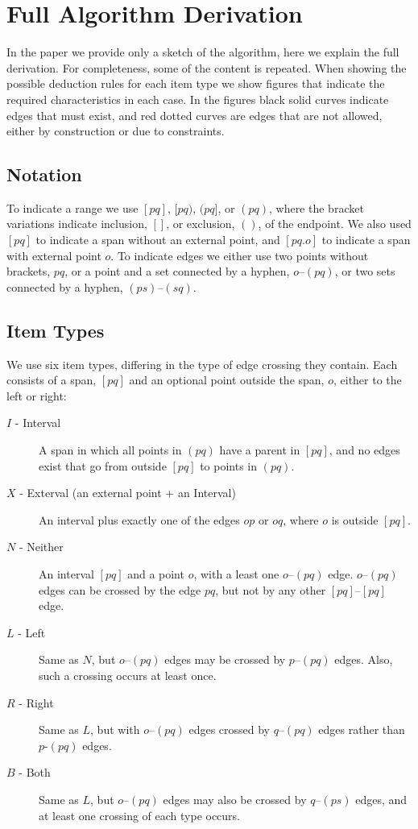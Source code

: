 \section{Full Algorithm Derivation}

In the paper we provide only a sketch of the algorithm, here we explain the full derivation.
For completeness, some of the content is repeated.
When showing the possible deduction rules for each item type we show figures that indicate the required characteristics in each case.
In the figures black solid curves indicate edges that must exist, and red dotted curves are edges that are not allowed, either by construction or due to constraints.

\subsection{Notation}

To indicate a range we use $[pq]$, $[pq)$, $(pq]$, or $(pq)$, where the bracket variations indicate inclusion, $[]$, or exclusion, $()$, of the endpoint.
We also used $[pq]$ to indicate a span without an external point, and $[pq.o]$ to indicate a span with external point $o$.
To indicate edges we either use two points without brackets, \myeg $pq$, or a point and a set connected by a hyphen, \myeg $o$--$(pq)$, or two sets connected by a hyphen, \myeg $(ps)$--$(sq)$.

\subsection{Item Types}

We use six item types, differing in the type of edge crossing they contain.
Each consists of a span, $[pq]$ and an optional point outside the span, $o$, either to the left or right:

\begin{description}
  \item[$I$ - Interval]
  A span in which all points in $(pq)$ have a parent in $[pq]$, and no edges exist that go from outside $[pq]$ to points in $(pq)$.
  \item[$X$ - Exterval (an external point + an Interval)]
  An interval plus exactly one of the edges $op$ or $oq$, where $o$ is outside $[pq]$.
  \item[$N$ - Neither]
  An interval $[pq]$ and a point $o$, with a least one $o$--$(pq)$ edge.
  $o$--$(pq)$ edges can be crossed by the edge $pq$, but not by any other $[pq]$--$[pq]$ edge.
  \item[$L$ - Left]
  Same as $N$, but $o$--$(pq)$ edges may be crossed by $p$--$(pq)$ edges. Also, such a crossing occurs at least once. 
  \item[$R$ - Right]
  Same as $L$, but with $o$--$(pq)$ edges crossed by $q$--$(pq)$ edges rather than $p$-$(pq)$ edges.
  \item[$B$ - Both]
  Same as $L$, but $o$--$(pq)$ edges may also be crossed by $q$--$(ps)$ edges, and at least one crossing of each type occurs.
\end{description}

